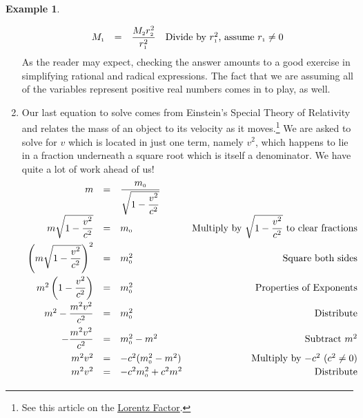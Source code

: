 \documentclass[11pt]{article}
\theoremstyle{definition}  %
\newtheorem{ex}{\bf Example}
\begin{document}
\begin{ex}
\begin{enumerate}
\[\begin{array}{rclr}
M_{\text{\tiny$1$}} & = & \dfrac{M_{\text{\tiny$2$}}r_{\text{\tiny$2$}}^2}{r_{\text{\tiny$1$}}^2} & \text{Divide by $r_{\text{\tiny$1$}}^2$, assume $r_{\text{\tiny$1$}} \neq 0$} \\
\end{array} \] As the reader may expect, checking the answer amounts to a good exercise in simplifying rational and radical expressions.  The fact that we are assuming all of the variables represent positive real numbers comes in to play, as well.

\item  Our last equation to solve comes from Einstein's Special Theory of Relativity and relates the mass of an object to its velocity as it moves.\footnote{See this article on the \href{http://en.wikipedia.org/wiki/Lorentz_factor}{\underline{Lorentz Factor}}.} We are asked to solve for $v$ which is located in just one term, namely $v^2$, which happens to lie in a fraction underneath a square root which is itself a denominator. We have quite a lot of work ahead of us!\[ \begin{array}{rclr}

 m &  = & \dfrac{m_{\text{\tiny$0$}}}{\sqrt{1 - \dfrac{v^2}{c^2}}} & \\

m \sqrt{1 - \dfrac{v^2}{c^2}} & = & m_{\text{\tiny$0$}} & \text{Multiply by $\sqrt{1 - \dfrac{v^2}{c^2}}$ to clear fractions}\\ [8pt]

\left(m \sqrt{1 - \dfrac{v^2}{c^2}}\right)^{2} & = & m_{\text{\tiny$0$}}^{2} & \text{Square both sides}\\ [12pt]

m^2 \left(1 - \dfrac{v^2}{c^2}\right) & = &  m_{\text{\tiny$0$}}^{2} & \text{Properties of Exponents}\\[8pt]

m^2 - \dfrac{m^2 v^2}{c^2} & = & m_{\text{\tiny$0$}}^{2} & \text{Distribute} \\[8pt]

- \dfrac{m^2 v^2}{c^2} & = & m_{\text{\tiny$0$}}^{2} - m^2 & \text{Subtract $m^2$}  \\ [8pt]

m^2 v^2 & = & -c^2 (m_{\text{\tiny$0$}}^{2} - m^2)  & \text{Multiply by $-c^2$ ($c^2 \neq 0$)} \\ [2pt]

m^2 v^2 & = & -c^2m_{\text{\tiny$0$}}^{2} + c^2 m^2 & \text{Distribute} \\[2pt]


\end{array}\]
\end{enumerate}
\end{ex}
\end{document}
